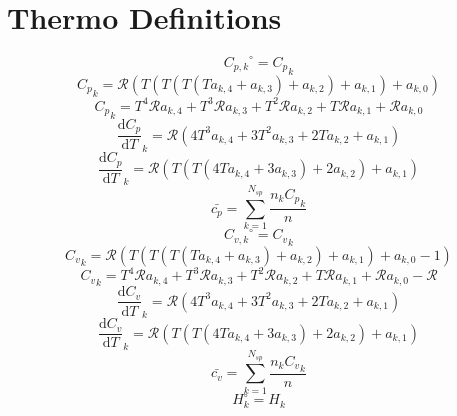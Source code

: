 \documentclass[a4paper,10pt]{article}
\newcommand{\ns}{N_{sp}}
\newcommand{\Ru}{\mathcal{R}}
\begin{document}
\section{Thermo Definitions}
\begin{dmath} {C_{p,k}}^{\circ} = {C_p}_{k}\end{dmath} 
\begin{dmath} {C_p}_{k} = \Ru \left(T \left(T \left(T \left(T a_{k,4} + a_{k,3}\right) + a_{k,2}\right) + a_{k,1}\right) + a_{k,0}\right)\end{dmath} 
\begin{dmath} {C_p}_{k} = T^{4} \Ru a_{k,4} + T^{3} \Ru a_{k,3} + T^{2} \Ru a_{k,2} + T \Ru a_{k,1} + \Ru a_{k,0}\end{dmath} 
\begin{dmath} \frac{\text{d} {C_p} }{\text{d} T }_{k} = \Ru \left(4 T^{3} a_{k,4} + 3 T^{2} a_{k,3} + 2 T a_{k,2} + a_{k,1}\right)\end{dmath} 
\begin{dmath} \frac{\text{d} {C_p} }{\text{d} T }_{k} = \Ru \left(T \left(T \left(4 T a_{k,4} + 3 a_{k,3}\right) + 2 a_{k,2}\right) + a_{k,1}\right)\end{dmath} 
\begin{dmath} \bar{c_p} = \sum_{k=1}^{\ns} \frac{n_{k} {C_p}_{k}}{n}\end{dmath} 
\begin{dmath} {C_{v,k}}^{\circ} = {C_v}_{k}\end{dmath} 
\begin{dmath} {C_v}_{k} = \Ru \left(T \left(T \left(T \left(T a_{k,4} + a_{k,3}\right) + a_{k,2}\right) + a_{k,1}\right) + a_{k,0} - 1\right)\end{dmath} 
\begin{dmath} {C_v}_{k} = T^{4} \Ru a_{k,4} + T^{3} \Ru a_{k,3} + T^{2} \Ru a_{k,2} + T \Ru a_{k,1} + \Ru a_{k,0} - \Ru\end{dmath} 
\begin{dmath} \frac{\text{d} {C_v} }{\text{d} T }_{k} = \Ru \left(4 T^{3} a_{k,4} + 3 T^{2} a_{k,3} + 2 T a_{k,2} + a_{k,1}\right)\end{dmath} 
\begin{dmath} \frac{\text{d} {C_v} }{\text{d} T }_{k} = \Ru \left(T \left(T \left(4 T a_{k,4} + 3 a_{k,3}\right) + 2 a_{k,2}\right) + a_{k,1}\right)\end{dmath} 
\begin{dmath} \bar{c_v} = \sum_{k=1}^{\ns} \frac{n_{k} {C_v}_{k}}{n}\end{dmath} 
\begin{dmath} H_k^{\circ} = H_{k}\end{dmath} 
\end{document}
